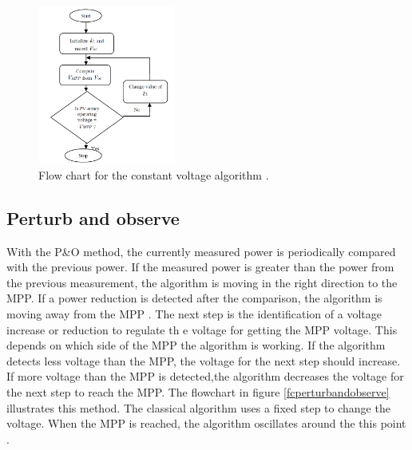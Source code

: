 \begin{figure}[H]
	\begin{center}
		\includegraphics[width=0.4\textwidth]{../Pictures/P1/Flow_chart/Flow_chart_constant_voltage}
		\caption{Flow chart for the constant voltage algorithm \cite{flowchartVC}. }
		\label{fcconstantvoltage}
	\end{center}	
\end{figure}

\subsection{Perturb and observe}
With the P\&O method, the currently measured power is periodically compared with the previous power. If the measured power is greater than the power from the previous measurement, the algorithm is moving in the right direction to the MPP. If a power reduction is detected after the comparison, the algorithm is moving away from the MPP . The next step is the identification of a voltage increase or reduction to regulate th
e voltage for getting the MPP voltage. This depends on which side of the MPP the algorithm is working. If the algorithm detects less voltage than the MPP, the voltage for the next step should increase. If more voltage than the MPP is detected,the algorithm decreases the voltage for the next step to reach the MPP.
The flowchart in figure \ref{fcperturbandobserve} illustrates this method. The classical algorithm uses a fixed step to change the voltage. When the MPP is reached, the algorithm oscillates around the this point \cite{flowchartVC}. 

